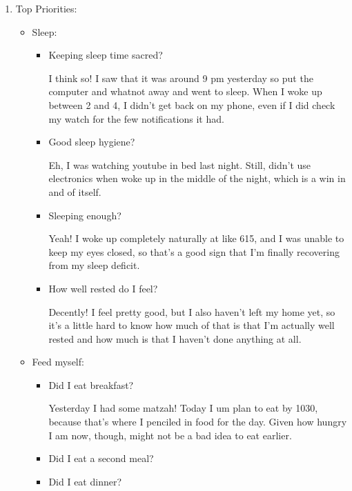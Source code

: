 \documentclass[12pt]{article}
\renewcommand{\,}{\textsuperscript{,}}
\begin{document}
\begin{enumerate}

\item Top Priorities:

\begin{itemize}

\item Sleep:

\begin{itemize}

\item Keeping sleep time sacred?

I think so! I saw that it was around 9 pm yesterday so put the computer and whatnot away and went to sleep.  
When I woke up between 2 and 4, I didn't get back on my phone, even if I did check my watch for the few notifications it had.

\item Good sleep hygiene?

Eh, I was watching youtube in bed last night.  
Still, didn't use electronics when woke up in the middle of the night, which is a win in and of itself.

\item Sleeping enough?

Yeah! I woke up completely naturally at like 615, and I was unable to keep my eyes closed, so that's a good sign that I'm finally recovering from my sleep deficit.

\item How well rested do I feel?

Decently! I feel pretty good, but I also haven't left my home yet, so it's a little hard to know how much of that is that I'm actually well rested and how much is that I haven't done anything at all.

\end{itemize}

\item Feed myself:

\begin{itemize}

\item Did I eat breakfast?

Yesterday I had some matzah!  
Today I um plan to eat by 1030, because that's where I penciled in food for the day.  
Given how hungry I am now, though, might not be a bad idea to eat earlier.

\item Did I eat a second meal?

\item Did I eat dinner?


\end{itemize}
\end{itemize}
\end{enumerate}
\end{document}
